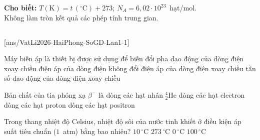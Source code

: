 
	\noindent\textbf{Cho biết:} $T(\text{K})=t\,(^\circ\text{C})+273$; $N_A=6{,}02\cdot 10^{23}$~hạt/mol.\\
	Không làm tròn kết quả các phép tính trung gian.

	\noindent
	\subsection*{}
	\setcounter{ex}{0}
	[ans/VatLi2026-HaiPhong-SoGD-Lan1-1]

	\begin{ex}%
		Máy biến áp là thiết bị được sử dụng để biến đổi
		\choice
		{pha dao động của dòng điện xoay chiều}
		{điện áp của dòng điện không đổi}
		{\True điện áp của dòng điện xoay chiều}
		{tần số dao động của dòng điện xoay chiều}
	\end{ex}

	\begin{ex}%
		Bản chất của tia phóng xạ $\beta^-$ là
		\choice
		{dòng các hạt nhân ${}^4_2\text{He}$}
		{\True dòng các hạt electron}
		{dòng các hạt proton}
		{dòng các hạt positron}
	\end{ex}

	\begin{ex}%
		Trong thang nhiệt độ Celsius, nhiệt độ sôi của nước tinh khiết ở điều kiện áp suất tiêu chuẩn ($1$~atm) bằng bao nhiêu?
		\choice
		{$10\,^\circ\text{C}$}
		{$273\,^\circ\text{C}$}
		{$0\,^\circ\text{C}$}
		{\True $100\,^\circ\text{C}$}
	\end{ex}

